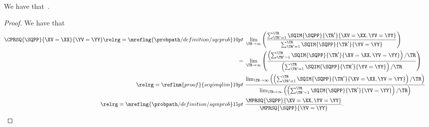 \begin{proposition}
  We have that\ \cprsqexprprop.%
\end{proposition}

\begin{proof}
  We have that
  \begin{align*}
    \CPRSQ{\SQPP}{\XV = \XX}{\YV = \YY} 
    \relrg = {\mreflng{\probpath/definition/sqcprob}} 10pt \ & 
    \lim_{\TR \rightarrow \infty}
    \left(
    \frac
    {\sum_{\TR' = 1}^{\TR}\SQIM{\SQPP}{\TR'}{\XV = \XX, \YV = \YY}}
    {\sum_{\TR' = 1}^{\TR}\SQIM{\SQPP}{\TR'}{\YV = \YY}}
    \right)\\
    = \ &
    \lim_{\TR \rightarrow \infty}
    \left(
    \frac
    {\left({\sum_{\TR' = 1}^{\TR}\SQIM{\SQPP}{\TR'}{\XV = \XX, \YV = \YY}}\right)/{\TR}}
    {\left(\sum_{\TR' = 1}^{\TR}\SQIM{\SQPP}{\TR'}{\YV = \YY}\right)/\TR}
    \right)\\
    \relrg = {\reflnm{proof}{seqimqlim}} 19pt \ & 
    \frac
    {
      \lim_{\TR \rightarrow \infty}\left(
    \left({\sum_{\TR' = 1}^{\TR}\SQIM{\SQPP}{\TR'}{\XV = \XX, \YV = \YY}}\right)/{\TR}\right)}
    {
      \lim_{\TR \rightarrow \infty}\left(
    \left(\sum_{\TR' = 1}^{\TR}\SQIM{\SQPP}{\TR'}{\YV = \YY}\right)/\TR\right)}
    \\
    \relrg = {\mreflng{\probpath/definition/sqmprob}} 15pt \ & 
    \frac { \MPRSQ{\SQPP}{\XV = \XX, \YV = \YY} } { \MPRSQ{\SQPP}{\YV = \YY} }.
  \end{align*}
\end{proof}
